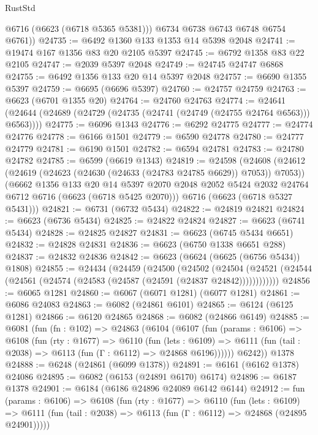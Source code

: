 \begin{lexlean}{RustStd}
\begin{coremodule}
          @6716
          (@6623 (@6718 @5365 @5381)))
        @6734
        @6738
        @6743
        @6748
        @6754
        @6761))
@24735 := @6492 @1360 @133 @1353 @14 @5398 @2048
@24741 := @19474 @167 @1356 @83 @20 @2105 @5397
@24745 := @6792 @1358 @83 @22 @2105
@24747 := @2039 @5397 @2048
@24749 := @24745 @24747 @6868
@24755 := @6492 @1356 @133 @20 @14 @5397 @2048
@24757 := @6690 @1355 @5397
@24759 := @6695 (@6696 @5397)
@24760 := @24757 @24759
@24763 := @6623 (@6701 @1355 @20)
@24764 := @24760 @24763
@24774 := @24641 (@24644 (@24689 (@24729 (@24735 (@24741 (@24749 (@24755 @24764 @6563))) @6563))))
@24775 := @6096 @1343
@24776 := @6292 @24775
@24777 := @24774 @24776
@24778 := @6166 @1501
@24779 := @6590 @24778
@24780 := @24777 @24779
@24781 := @6190 @1501
@24782 := @6594 @24781
@24783 := @24780 @24782
@24785 := @6599 (@6619 @1343)
@24819 := @24598
    (@24608
      (@24612 (@24619 (@24623 (@24630 (@24633 (@24783 @24785 @6629)) @7053)) @7053))
      (@6662
        @1356
        @133
        @20
        @14
        @5397
        @2070
        @2048
        @2052
        @5424
        @2032
        @24764
        @6712
        @6716
        (@6623 (@6718 @5425 @2070)))
      @6716
      (@6623 (@6718 @5327 @5431)))
@24821 := @6731 (@6732 @5434)
@24822 := @24819 @24821
@24824 := @6623 (@6736 @5434)
@24825 := @24822 @24824
@24827 := @6623 (@6741 @5434)
@24828 := @24825 @24827
@24831 := @6623 (@6745 @5434 @6651)
@24832 := @24828 @24831
@24836 := @6623 (@6750 @1338 @6651 @288)
@24837 := @24832 @24836
@24842 := @6623 (@6624 (@6625 (@6756 @5434)) @1808)
@24855 := @24434
    (@24459
      (@24500
        (@24502
          (@24504 (@24521 (@24544 (@24561 (@24574 (@24583 (@24587 (@24591 (@24837 @24842))))))))))))
@24856 := @6065 @1281
@24860 := @6067 (@6071 @1281) (@6077 @1281)
@24861 := @6086 @24083
@24863 := @6082 (@24861 @6101)
@24865 := @6124 (@6125 @1281)
@24866 := @6120 @24865
@24868 := @6082 (@24866 @6149)
@24885 := @6081
    (fun (fn : @102) =>
    @24863
      (@6104
        (@6107
          (fun (params : @6106) =>
          @6108
            (fun (rty : @1677) =>
            @6110
              (fun (lets : @6109) =>
              @6111 (fun (tail : @2038) => @6113 (fun (Γ : @6112) => @24868 @6196))))))
        @6242))
    @1378
@24888 := @6248 (@24861 (@6099 @1378))
@24891 := @6161 (@6162 @1378) @24086
@24895 := @6082 (@6153 (@24891 @6170) @6174)
@24896 := @6187 @1378
@24901 := @6184 (@6186 @24896 @24089 @6142 @6144)
@24912 := fun (params : @6106) =>
  @6108
    (fun (rty : @1677) =>
    @6110
      (fun (lets : @6109) =>
      @6111 (fun (tail : @2038) => @6113 (fun (Γ : @6112) => @24868 (@24895 @24901)))))

\end{coremodule}
\end{lexlean}
